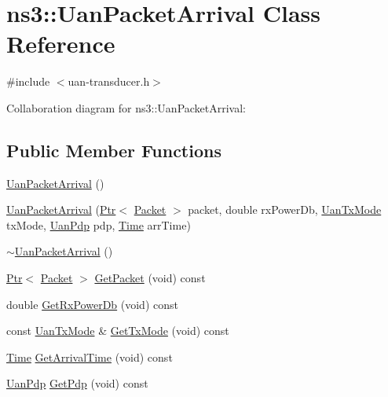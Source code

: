 \hypertarget{classns3_1_1UanPacketArrival}{}\section{ns3\+:\+:Uan\+Packet\+Arrival Class Reference}
\label{classns3_1_1UanPacketArrival}


{\ttfamily \#include $<$uan-\/transducer.\+h$>$}



Collaboration diagram for ns3\+:\+:Uan\+Packet\+Arrival\+:
\subsection*{Public Member Functions}
\begin{DoxyCompactItemize}
\item 
\hyperlink{classns3_1_1UanPacketArrival_add059ade5af949656b614bee1c04152a}{Uan\+Packet\+Arrival} ()
\item 
\hyperlink{classns3_1_1UanPacketArrival_a82f030b5b9f80804d2eda75d16600483}{Uan\+Packet\+Arrival} (\hyperlink{classns3_1_1Ptr}{Ptr}$<$ \hyperlink{classns3_1_1Packet}{Packet} $>$ packet, double rx\+Power\+Db, \hyperlink{classns3_1_1UanTxMode}{Uan\+Tx\+Mode} tx\+Mode, \hyperlink{classns3_1_1UanPdp}{Uan\+Pdp} pdp, \hyperlink{classns3_1_1Time}{Time} arr\+Time)
\item 
\hyperlink{classns3_1_1UanPacketArrival_a93b280d67b774a4dd23d5992d1818389}{$\sim$\+Uan\+Packet\+Arrival} ()
\item 
\hyperlink{classns3_1_1Ptr}{Ptr}$<$ \hyperlink{classns3_1_1Packet}{Packet} $>$ \hyperlink{classns3_1_1UanPacketArrival_a2a69e7400b3a9ed23b64f3965b2b18cb}{Get\+Packet} (void) const 
\item 
double \hyperlink{classns3_1_1UanPacketArrival_af2120c42a653078be38299f40c153267}{Get\+Rx\+Power\+Db} (void) const 
\item 
const \hyperlink{classns3_1_1UanTxMode}{Uan\+Tx\+Mode} \& \hyperlink{classns3_1_1UanPacketArrival_abda5c0eacd855f330d136b60fe2e3be5}{Get\+Tx\+Mode} (void) const 
\item 
\hyperlink{classns3_1_1Time}{Time} \hyperlink{classns3_1_1UanPacketArrival_a8e4d1d77e550ea650a886ad7775de98e}{Get\+Arrival\+Time} (void) const 
\item 
\hyperlink{classns3_1_1UanPdp}{Uan\+Pdp} \hyperlink{classns3_1_1UanPacketArrival_a3dc611c9665c75776f83f4949f5641ce}{Get\+Pdp} (void) const 
\end{DoxyCompactItemize}
